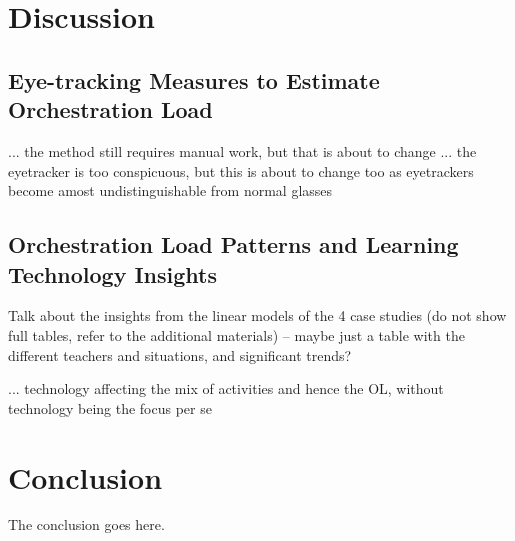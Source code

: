 \documentclass[10pt,journal,compsoc]{IEEEtran}
\begin{document}
\section{Discussion}

\subsection{Eye-tracking Measures to Estimate Orchestration Load}

... the method still requires manual work, but that is about to change \cite{prieto2016teaching}
... the eyetracker is too conspicuous, but this is about to change too as eyetrackers become amost undistinguishable from normal glasses


\subsection{Orchestration Load Patterns and Learning Technology Insights}

Talk about the insights from the linear models of the 4 case studies (do not show full tables, refer to the additional materials) -- maybe just a table with the different teachers and situations, and significant trends?

... technology affecting the mix of activities and hence the OL, without technology being the focus per se

\section{Conclusion}
The conclusion goes here.






%
\end{document}
